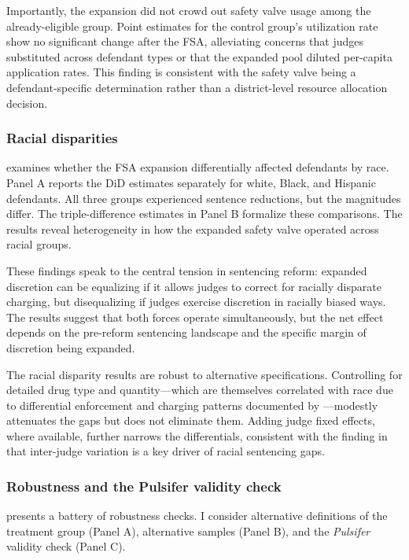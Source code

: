 \documentclass[12pt]{article}
\begin{document}
Importantly, the expansion did not crowd out safety valve usage among the already-eligible group. Point estimates for the control group's utilization rate show no significant change after the FSA, alleviating concerns that judges substituted across defendant types or that the expanded pool diluted per-capita application rates. This finding is consistent with the safety valve being a defendant-specific determination rather than a district-level resource allocation decision.



\subsubsection*{Racial disparities}
 examines whether the FSA expansion differentially affected defendants by race. Panel A reports the DiD estimates separately for white, Black, and Hispanic defendants. All three groups experienced sentence reductions, but the magnitudes differ. The triple-difference estimates in Panel B formalize these comparisons. The results reveal heterogeneity in how the expanded safety valve operated across racial groups.

These findings speak to the central tension in sentencing reform: expanded discretion can be equalizing if it allows judges to correct for racially disparate charging, but disequalizing if judges exercise discretion in racially biased ways. The results suggest that both forces operate simultaneously, but the net effect depends on the pre-reform sentencing landscape and the specific margin of discretion being expanded.

The racial disparity results are robust to alternative specifications. Controlling for detailed drug type and quantity---which are themselves correlated with race due to differential enforcement and charging patterns documented by \citet{starr2013mandatory}---modestly attenuates the gaps but does not eliminate them. Adding judge fixed effects, where available, further narrows the differentials, consistent with the finding in \citet{abrams2012judges} that inter-judge variation is a key driver of racial sentencing gaps.



\subsubsection*{Robustness and the Pulsifer validity check}
 presents a battery of robustness checks. I consider alternative definitions of the treatment group (Panel A), alternative samples (Panel B), and the \textit{Pulsifer} validity check (Panel C).
\end{document}
